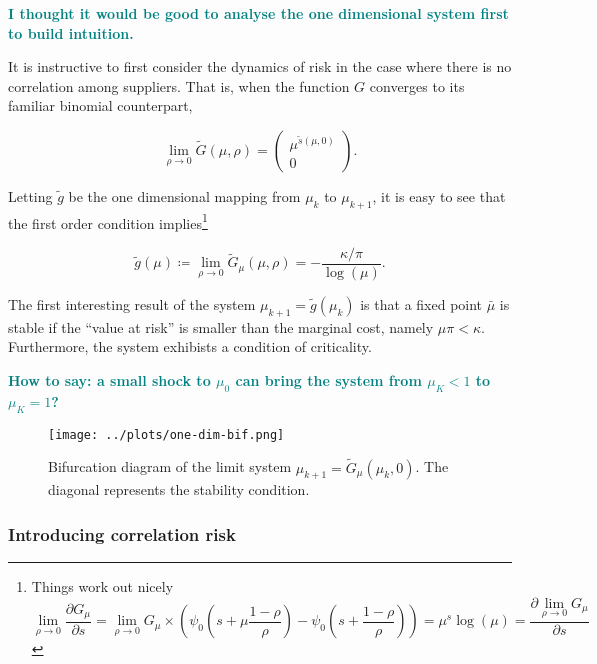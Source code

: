 \documentclass[draft, american, abstract=on]{scrartcl}
\theoremstyle{plain}
\newcommand\notes[1]{\textcolor{teal}{\footnotesize \textbf{#1}}}
\begin{document}
\notes{I thought it would be good to analyse the one dimensional system first to build intuition.}

It is instructive to first consider the dynamics of risk in the case where there is no correlation among suppliers. That is, when the function $G$ converges to its familiar binomial counterpart,

\begin{equation}
   \lim_{\rho \rightarrow 0} \tilde{G}(\mu, \rho) = \begin{pmatrix} \mu^{\tilde{s}(\mu, 0)} \\ 0 \end{pmatrix}.
\end{equation}

Letting $\tilde{g}$ be the one dimensional mapping from $\mu_{k}$ to $\mu_{k + 1}$, it is easy to see that the first order condition implies\footnote{
  Things work out nicely
\begin{equation}
  \lim_{\rho \rightarrow 0} \frac{\partial G_\mu}{\partial s} = \lim_{\rho \rightarrow 0} G_\mu \times \left(\psi_0\left(s + \mu \frac{1 - \rho}{\rho} \right) - \psi_0\left(s + \frac{1 - \rho}{\rho} \right) \right) = \mu^{s} \log(\mu) = \frac{\partial \lim_{\rho \rightarrow 0} G_{\mu}}{\partial s}
\end{equation}
}

\begin{equation}
  \tilde{g}(\mu) \coloneqq \lim_{\rho \rightarrow 0}\tilde{G}_\mu(\mu, \rho) = -\frac{\kappa / \pi}{\log(\mu)}.
\end{equation}

The first interesting result of the system $\mu_{k + 1} = \tilde{g}(\mu_k)$ is that a fixed point $\bar{\mu}$ is stable if the ``value at risk'' is smaller than the marginal cost, namely $\mu \pi < \kappa$. Furthermore, the system exhibists a condition of criticality. 

\notes{How to say: a small shock to $\mu_0$ can bring the system from $\mu_{K} < 1$ to $\mu_K = 1$?}

\begin{figure}[H]
  \centering
  \texttt{[image: ../plots/one-dim-bif.png]}
  \caption{Bifurcation diagram of the limit system $\mu_{k + 1} = \tilde{G}_{\mu}(\mu_k, 0)$. The diagonal represents the stability condition.}
  \label{fig:one-dimensional-bifurcation}
\end{figure}

\subsubsection{Introducing correlation risk}
\end{document}
